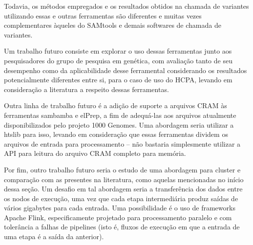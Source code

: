 \documentclass[cic,tc]{iiufrgs}
\begin{document}
Todavia, os métodos empregados e os resultados obtidos na chamada de variantes
utilizando essas e outras ferramentas são diferentes e muitas vezes
complementares àqueles do SAMtools e demais softwares de chamada de
variantes.\cite{gezsi2015variantmetacaller}\cite{guo2015seqmule}

Um trabalho futuro consiste em explorar o uso dessas ferramentas junto aos
pesquisadores do grupo de pesquisa em genética, com avaliação tanto de seu
desempenho como da aplicabilidade desse ferramental considerando os resultados
potencialmente diferentes entre si, para o caso de uso do HCPA, levando em
consideração a literatura a respeito dessas ferramentas.

Outra linha de trabalho futuro é a adição de suporte a arquivos CRAM às
ferramentas sambamba e elPrep, a fim de adequá-las aos arquivos atualmente
disponibilizados pelo projeto 1000 Genomes. Uma abordagem seria utilizar a
htslib para isso, levando em consideração que essas ferramentas dividem os
arquivos de entrada para processamento -- não bastaria simplesmente utilizar a
API para leitura do arquivo CRAM completo para memória.

Por fim, outro trabalho futuro seria o estudo de uma abordagem para cluster e
comparação com as presentes na literatura, como aquelas mencionadas no início
dessa seção. Um desafio em tal abordagem seria a transferência dos dados entre
os nodos de execução, uma vez que cada etapa intermediária produz saídas de
vários gigabytes para cada entrada. Uma possibilidade é o uso de frameworks
Apache Flink, especificamente projetado para processamento paralelo e com
tolerância a falhas de pipelines (isto é, fluxos de execução em que a entrada
de uma etapa é a saída da anterior).\cite{carbone2015apache}



\end{document}
